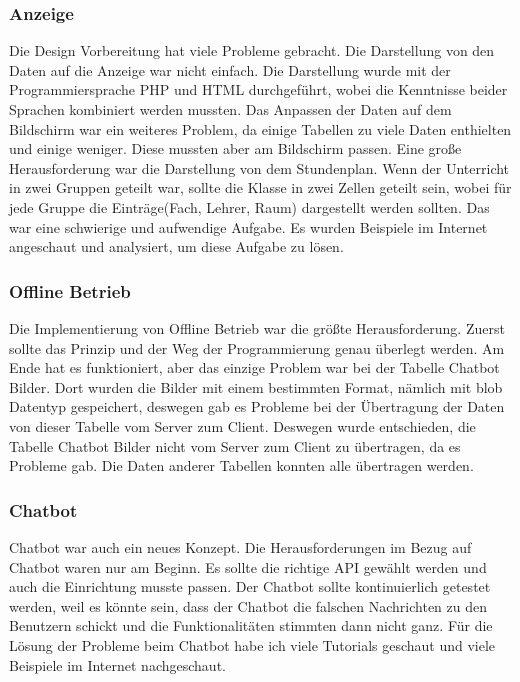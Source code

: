 \subsubsection{Anzeige}
Die Design Vorbereitung hat viele Probleme gebracht. Die Darstellung von den Daten auf die Anzeige war nicht einfach. Die Darstellung wurde mit der Programmiersprache PHP und HTML durchgeführt, wobei die Kenntnisse beider Sprachen kombiniert werden mussten. Das Anpassen der Daten auf dem Bildschirm war ein weiteres Problem, da einige Tabellen zu viele Daten enthielten und einige weniger. Diese mussten aber am Bildschirm passen. Eine gro\ss{}e Herausforderung war die Darstellung von dem Stundenplan. Wenn der Unterricht in zwei Gruppen geteilt war, sollte die Klasse in zwei Zellen geteilt sein, wobei f\"ur jede Gruppe die Eintr\"age(Fach, Lehrer, Raum) dargestellt werden sollten. Das war eine schwierige und aufwendige Aufgabe. Es wurden Beispiele im Internet angeschaut und analysiert, um diese Aufgabe zu l\"osen.

\subsubsection{Offline Betrieb}
Die Implementierung von Offline Betrieb war die gr\"o{\ss}te Herausforderung. Zuerst sollte das Prinzip und der Weg der Programmierung genau \"uberlegt werden. Am Ende hat es funktioniert, aber das einzige Problem war bei der Tabelle Chatbot Bilder. Dort wurden die Bilder mit einem bestimmten Format, n\"amlich mit blob Datentyp gespeichert, deswegen gab es Probleme bei der \"Ubertragung der Daten von dieser Tabelle vom Server zum Client. Deswegen wurde entschieden, die Tabelle Chatbot Bilder nicht vom Server zum Client zu \"ubertragen, da es Probleme gab. Die Daten anderer Tabellen konnten alle \"ubertragen werden.

\subsubsection{Chatbot}

Chatbot war auch ein neues Konzept. Die Herausforderungen im Bezug auf Chatbot waren nur am Beginn. Es sollte die richtige API gewählt werden und auch die Einrichtung musste passen. Der Chatbot sollte kontinuierlich getestet werden, weil es k\"onnte sein, dass der Chatbot die falschen Nachrichten zu den Benutzern schickt und die Funktionalit\"aten stimmten dann nicht ganz. F\"ur die L\"osung der Probleme beim Chatbot habe ich viele Tutorials geschaut und viele Beispiele im Internet nachgeschaut. 

